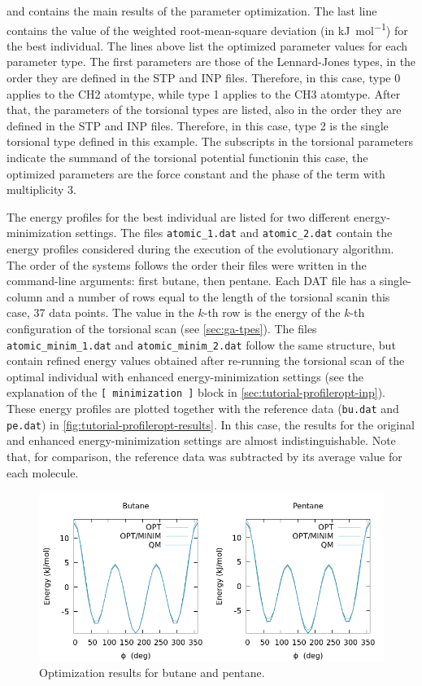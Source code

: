 \documentclass[10pt,a4paper,openany]{memoir}
\numberwithin{equation}{section}
\begin{document}
\noindent
and contains the main results of the parameter optimization.  The last line
contains the value of the weighted root-mean-square deviation (in
\si{\kJ\per\mole}) for the best individual.  The lines above list the optimized
parameter values for each parameter type.  The first parameters are those of the
Lennard-Jones types, in the order they are defined in the STP and INP files.
Therefore, in this case, type 0 applies to the CH2 atomtype, while type 1
applies to the CH3 atomtype.  After that, the parameters of the torsional types
are listed, also in the order they are defined in the STP and INP files.
Therefore, in this case, type 2 is the single torsional type defined in this
example. The subscripts in the torsional parameters indicate the summand of the
torsional potential function\textemdash{}in this case, the optimized parameters
are the force constant and the phase of the term with multiplicity 3.

The energy profiles for the best individual are listed for two
different energy-minimization settings. The files
\texttt{atomic\_1.dat} and \texttt{atomic\_2.dat} contain the energy
profiles considered during the execution of the evolutionary
algorithm.  The order of the systems follows the order their files
were written in the command-line arguments: first butane, then
pentane. Each DAT file has a single-column and a number of rows equal
to the length of the torsional scan\textemdash{}in this case, 37 data
points. The value in the $k$-th row is the energy of the $k$-th
configuration of the torsional scan (see \autoref{sec:ga-tpes}).  The
files \texttt{atomic\_minim\_1.dat} and \texttt{atomic\_minim\_2.dat}
follow the same structure, but contain refined energy values obtained
after re-running the torsional scan of the optimal individual with
enhanced energy-minimization settings (see the explanation of the
\texttt{[~minimization~]} block in
\autoref{sec:tutorial-profileropt-inp}). These energy profiles are
plotted together with the reference data (\texttt{bu.dat} and
\texttt{pe.dat}) in \autoref{fig:tutorial-profileropt-results}.  In
this case, the results for the original and enhanced
energy-minimization settings are almost indistinguishable.  Note that,
for comparison, the reference data was subtracted by its average value
for each molecule.

\begin{figure}[tb]
  \centering
  \includegraphics[width=.8\textwidth]{opt-results}
  \caption{Optimization results for butane and pentane.}
  \label{fig:tutorial-profileropt-results}
\end{figure}
\end{document}

